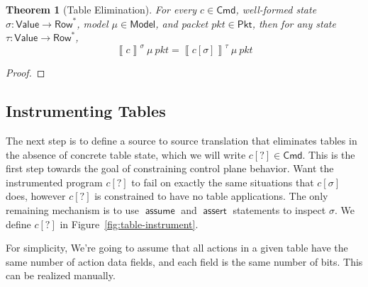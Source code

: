 \documentclass{article}
\newcommand{\pkt}{\mathit{pkt}}
\newcommand{\denote}[1]{\left\llbracket#1\right\rrbracket}
\newcommand{\Value}{\mathsf{Value}}
\newcommand{\Cmd}{\mathsf{Cmd}}
\newcommand{\Pkt}{\mathsf{Pkt}}
\newcommand{\Model}{\mathsf{Model}}
\newcommand{\Row}{\mathsf{Row}}
\newcommand{\assert}{\mathop{\mathsf{assert}}}
\newcommand{\assume}{\mathop{\mathsf{assume}}}
\newtheorem{theorem}{Theorem}
\begin{document}
\begin{theorem}[Table Elimination]
  For every $c \in \Cmd$, well-formed state $\sigma : \Value \to \Row^*$, model
  $\mu \in \Model$, and packet $\pkt \in \Pkt$, then for any state $\tau :
  \Value \to \Row^*$,
  \[\denote{c}^\sigma~\mu~\pkt = \denote{c[\sigma]}^\tau~\mu~\pkt\]
\end{theorem}
\begin{proof}
\end{proof}


\subsection{Instrumenting Tables}

The next step is to define a source to source translation that eliminates tables
in the absence of concrete table state, which we will write $c[?] \in \Cmd$.
This is the first step towards the goal of constraining control plane behavior.
Want the instrumented program $c[?]$ to fail on exactly the same situations that
$c[\sigma]$ does, however $c[?]$ is constrained to have no table applications.
The only remaining mechanism is to use $\assume$ and $\assert$ statements to
inspect $\sigma$. We define $c[?]$ in Figure~\ref{fig:table-instrument}.

For simplicity, We're going to assume that all actions in a given table have the
same number of action data fields, and each field is the same number of bits.
This can be realized manually.
\end{document}
